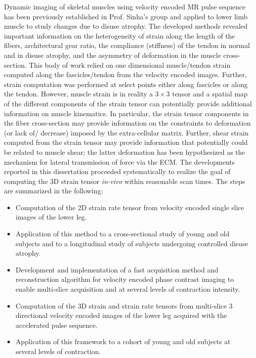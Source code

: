 Dynamic imaging of skeletal muscles using velocity encoded MR pulse sequence has been previously established in Prof. Sinha's group and applied to lower limb muscle to study changes due to disuse atrophy. 
The developed methods revealed important information on the heterogeneity of strain along the length of the fibers, architectural gear ratio, the compliance (stiffness) of the tendon in normal and in disuse atrophy, and the asymmetry of deformation in the muscle cross-section. 
This body of work relied on one dimensional muscle/tendon strain computed along the fascicles/tendon from the velocity encoded images. 
Further, strain computation was performed at select points either along fascicles or along the tendon. 
However, muscle strain is in reality a $3 \times 3$ tensor and a spatial map of the different components of the strain tensor can potentially provide additional information on muscle kinematics. 
In particular, the strain tensor components in the fiber cross-section may provide information on the constraints to deformation (or lack of/ decrease) imposed by the extra-cellular matrix. 
Further, shear strain computed from the strain tensor may provide information that potentially could be related to muscle shear; the latter deformation has been hypothesized as the mechanism for lateral transmission of force via the ECM. 
The developments reported in this dissertation proceeded systematically to realize the goal of computing the 3D strain tensor \textit{in-vivo} within reasonable scan times. 
The steps are summarized in the following: 
\begin{itemize}
\item Computation of the 2D strain rate tensor from velocity encoded single slice images of the lower leg.
\item Application of this method to a cross-sectional study of young and old subjects and to a longitudinal study of subjects undergoing controlled disuse atrophy.
\item Development and implementation of a fast acquisition method and reconstruction algorithm for velocity encoded phase contrast imaging to enable multi-slice acquisition and at several levels of contraction intensity.
\item Computation of the 3D strain and strain rate tensors from multi-slice 3 directional velocity encoded images of the lower leg acquired with the accelerated pulse sequence.
\item Application of this framework to a cohort of young and old subjects at several levels of contraction.	
\end{itemize}

